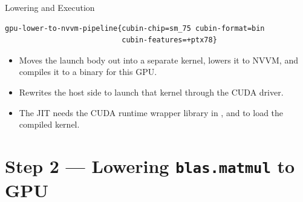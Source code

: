 \documentclass[aspectratio=169,10pt]{beamer}
\begin{document}
\begin{frame}[fragile]{Lowering and Execution}
\begin{lstlisting}[style=plain,basicstyle=\ttfamily\small]
gpu-lower-to-nvvm-pipeline{cubin-chip=sm_75 cubin-format=bin
                           cubin-features=+ptx78}
\end{lstlisting}
  \vspace{0.4em}
  \begin{itemize}
    \item<2-> Moves the launch body out into a separate kernel, lowers it to
      NVVM, and compiles it to a binary for this GPU.
    \item<3-> Rewrites the host side to launch that kernel through the CUDA
      driver.
    \item<4-> The JIT needs the CUDA runtime wrapper library in
      , and  to load the compiled
      kernel.
  \end{itemize}
  \vspace{0.4em}
\end{frame}

\section{Step 2 --- Lowering \texttt{blas.matmul} to GPU}
\begin{frame}[plain]\sectionpage{}\end{frame}
\end{document}
